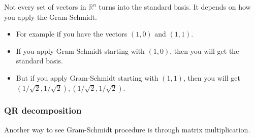     \begin{warning}
        Not every set of vectors in $\mathbb{R}^n$ turns into the standard basis. It depends on how you apply the Gram-Schmidt. 
        \begin{itemize}
            \item For example if you have the vectors $(1,0)$ and $(1,1)$. 
            \item If you apply Gram-Schmidt starting with $(1,0)$, then you will get the standard basis. 
            \item But if you apply Gram-Schmidt starting with $(1,1)$, then you will get $(1/\sqrt{2},1/\sqrt{2}),(1/\sqrt{2},1/\sqrt{2})$.
        \end{itemize}
    \end{warning}

    \subsubsection{QR decomposition}
    Another way to see Gram-Schmidt procedure is through matrix multiplication.
